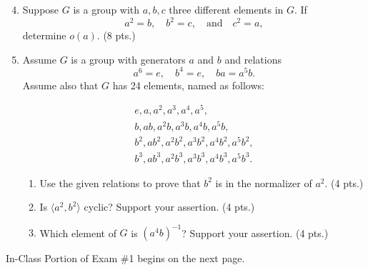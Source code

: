 \newpage
\begin{enumerate}
    \setcounter{enumi}{3} %
    \setlength{\itemsep}{15pt} %
    \item Suppose $ G $ is a group with $ a, b, c $ three different elements in $ G $. If 
    \[
    a^2 = b, \quad b^2 = c, \quad \text{and} \quad c^2 = a,
    \]
    determine $ o(a) $. \hfill (8 pts.)

    \item Assume $ G $ is a group with generators $ a $ and $ b $ and relations
    \[
    \boxed{a^6 = e, \quad b^4 = e, \quad ba = a^5 b.}
    \]
    Assume also that $ G $ has 24 elements, named as follows:
    
    \[
    \boxed{
        \begin{array}{l}
            e, a, a^2, a^3, a^4, a^5,  \\ 
            b, ab, a^2b, a^3b, a^4b, a^5b, \\ 
            b^2, a b^2, a^2 b^2, a^3 b^2, a^4 b^2, a^5 b^2, \\ 
            b^3, a b^3, a^2 b^3, a^3 b^3, a^4 b^3, a^5 b^3.
        \end{array}
        }
    \]

    \begin{enumerate}
        \setlength{\itemsep}{10pt} %
        \item[(a)] Use the given relations to prove that $ b^2 $ is in the normalizer of $ a^2 $. \hfill (4 pts.)
        
        \item[(b)] Is $ \langle a^2, b^2 \rangle $ cyclic? Support your assertion. \hfill (4 pts.)
        
        \item[(c)] Which element of $ G $ is $ (a^4 b)^{-1} $? Support your assertion. \hfill (4 pts.)
    \end{enumerate}
\end{enumerate}
\vspace{0.25in}
\begin{tcolorbox}
    \begin{center}
        In-Class Portion of Exam \#1 begins on the next page.
    \end{center}
\end{tcolorbox}
\newpage

